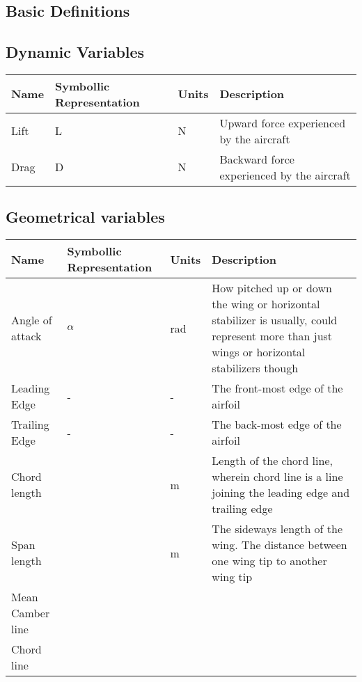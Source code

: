 \documentclass[a4paper, 12pt]{report}
\begin{document}
\begin{center}
\chapter{Basic Definitions}
\begin{comment}
\end{comment}
\section{Dynamic Variables}
\begin{comment}
\end{comment}
\begin{tabular}{|m{\tabsize}|m{\tabsize}|m{\tabsize}|m{\tabsizel}|}
\hline
Name & Symbollic Representation & Units & Description \\  
\hline
Lift & L & N & Upward force experienced by the aircraft\\   
\hline
Drag & D & N & Backward force experienced by the aircraft\\
\hline
\end{tabular}
\section{Geometrical variables}
\begin{comment}
\end{comment}
\begin{tabular}{|m{\tabsize}|m{\tabsize}|m{\tabsize}|m{\tabsizel}|}
\hline
Name & Symbollic Representation & Units & Description \\                                                  \hline                                                                                                    
Angle of attack & $\alpha$ & rad & How pitched up or down the wing or horizontal stabilizer is usually, could represent more than just wings or horizontal stabilizers though\\ 
\hline
Leading Edge & - & - & The front-most edge of the airfoil \\
\hline
Trailing Edge & - & - & The back-most edge of the airfoil\\
\hline
Chord length &  & m & Length of the chord line, wherein chord line is a line joining the leading edge and trailing edge\\
\hline
Span length & & m & The sideways length of the wing. The distance between one wing tip to another wing tip\\
\hline
Mean Camber line & & & \\
\hline
Chord line & & & \\
\hline
\end{tabular}

\end{center}
\end{document}
